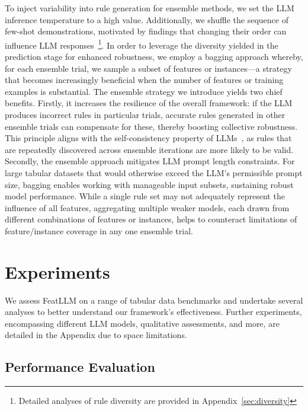 To inject variability into rule generation for ensemble methods, we set the LLM inference temperature to a high value. Additionally, we shuffle the sequence of few-shot demonstrations, motivated by findings that changing their order can influence LLM responses~\cite{lu2022fantastically}\footnote{Detailed analyses of rule diversity are provided in Appendix~\ref{sec:diversity}}. In order to leverage the diversity yielded in the prediction stage for enhanced robustness, we employ a bagging approach whereby, for each ensemble trial, we sample a subset of features or instances—a strategy that becomes increasingly beneficial when the number of features or training examples is substantial. The ensemble strategy we introduce yields two chief benefits. Firstly, it increases the resilience of the overall framework: if the LLM produces incorrect rules in particular trials, accurate rules generated in other ensemble trials can compensate for these, thereby boosting collective robustness. This principle aligns with the self-consistency property of LLMs~\cite{wang2022self}, as rules that are repeatedly discovered across ensemble iterations are more likely to be valid. Secondly, the ensemble approach mitigates LLM prompt length constraints. For large tabular datasets that would otherwise exceed the LLM’s permissible prompt size, bagging enables working with manageable input subsets, sustaining robust model performance. While a single rule set may not adequately represent the influence of all features, aggregating multiple weaker models, each drawn from different combinations of features or instances, helps to counteract limitations of feature/instance coverage in any one ensemble trial.

\section{Experiments}
We assess \textsf{FeatLLM} on a range of tabular data benchmarks and undertake several analyses to better understand our framework’s effectiveness. Further experiments, encompassing different LLM models, qualitative assessments, and more, are detailed in the Appendix due to space limitations.

\subsection{Performance Evaluation}
